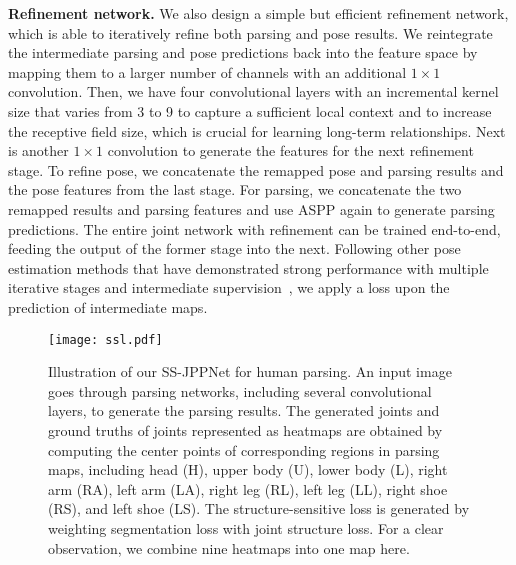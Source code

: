 \documentclass[10pt,journal,compsoc]{IEEEtran}
\begin{document}
\textbf{Refinement network.}
We also design a simple but efficient refinement network, which is able to iteratively refine both parsing and pose results. We reintegrate the intermediate parsing and pose predictions back into the feature space by mapping them to a larger number of channels with an additional $1\times1$ convolution. Then, we have four convolutional layers with an incremental kernel size that varies from 3 to 9 to capture a sufficient local context and to increase the receptive field size, which is crucial for learning long-term relationships. Next is another $1\times1$ convolution to generate the features for the next refinement stage. To refine pose, we concatenate the remapped pose and parsing results and the pose features from the last stage. For parsing, we concatenate the two remapped results and parsing features and use ASPP again to generate parsing predictions. The entire joint network with refinement can be trained end-to-end, feeding the output of the former stage into the next. Following other pose estimation methods that have demonstrated strong performance with multiple iterative stages and intermediate supervision~\cite{Wei_2016_CVPR,newell2016stacked,carreira2016human}, we apply a loss upon the prediction of intermediate maps.



\begin{figure}[t]
\centering
   \texttt{[image: ssl.pdf]}
\vspace{-7mm}
\caption{Illustration of our SS-JPPNet for human parsing. An input image goes through parsing networks, including several convolutional layers, to generate the parsing results. The generated joints and ground truths of joints represented as heatmaps are obtained by computing the center points of corresponding regions in parsing maps, including head (H), upper body (U), lower body (L), right arm (RA), left arm (LA), right leg (RL), left leg (LL), right shoe (RS), and left shoe (LS). The structure-sensitive loss is generated by weighting segmentation loss with joint structure loss. For a clear observation,  we combine nine heatmaps into one map here.}
\vspace{-2mm}
\label{fig:ss_jppnet}
\end{figure}
\end{document}
